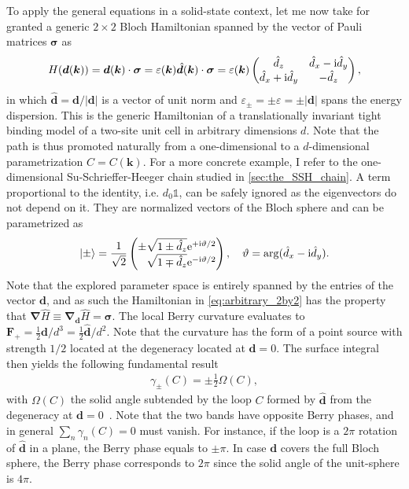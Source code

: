 To apply the general equations in a solid-state context, let me now take for granted a generic $2\times 2$ Bloch Hamiltonian spanned by the vector of Pauli matrices $\bm\sigma$ as
\begin{align}
    H(\bm d(\bm k)) = \bm d(\bm k)\cdot\bm\sigma = \varepsilon(\bm k) \hat{\bm d}(\bm k)\cdot\bm\sigma
    =
    \varepsilon(\bm k)
    \begin{pmatrix}
        \hat{d}_z & \hat{d}_x - \mathrm i \hat{d}_y \\
        \hat{d}_x + \mathrm i \hat{d}_y & -\hat{d}_z
    \end{pmatrix},
    \label{eq:arbitrary_2by2}
\end{align}
in which $\hat{\bm d}={\bm d}/|\bm d|$ is a vector of unit norm and $\varepsilon_\pm = \pm\varepsilon = \pm|\bm d|$ spans the energy dispersion.
This is the generic Hamiltonian of a translationally invariant tight binding model of a two-site unit cell in arbitrary dimensions $d$.
Note that the path is thus promoted naturally from a one-dimensional to a $d$-dimensional parametrization $C=C(\bm k)$.
For a more concrete example, I refer to the one-dimensional Su-Schrieffer-Heeger chain studied in \cref{sec:the_SSH_chain}.
A term proportional to the identity, i.e. $d_0\mathbb 1$, can be safely ignored as the eigenvectors do not depend on it.
They are normalized vectors of the Bloch sphere and can be parametrized as
\begin{align}
    \ket{\pm} = \frac{1}{\sqrt{2}}
    \begin{pmatrix}
        \pm \sqrt{1 \pm \hat{d}_z}\re^{+\ri\vartheta/2}\\
        \phantom\pm\sqrt{1 \mp \hat{d}_z}\re^{-\ri\vartheta/2}
    \end{pmatrix}
    ,
    \quad
    \vartheta = \arg(\hat{d}_x-\ri \hat{d}_y).
\end{align}
Note that the explored parameter space is entirely spanned by the entries of the vector $\bm d$, and as such the Hamiltonian in \cref{eq:arbitrary_2by2} has the property that $\bm\nabla\hat H \equiv \bm\nabla_{\bm d}\hat H = \bm\sigma$.
The local Berry curvature evaluates to ${\bm F}_+ = \frac12\bm d/d^3=\frac12\hat{\bm d}/d^2$.
Note that the curvature has the form of a point source with strength $1/2$ located at the degeneracy located at $\bm d=0$.
The surface integral then yields the following fundamental result
\begin{align}
    \gamma_{\pm}(C) = \pm\frac12\Omega(C),
\end{align}
with $\Omega(C)$ the solid angle subtended by the loop $C$ formed by $\hat {\bm d}$ from the degeneracy at $\bm d=0$~\cite{Berry1984}.
Note that the two bands have opposite Berry phases, and in general $\sum_n\gamma_n(C)=0$ must vanish.
For instance, if the loop is a $2\pi$ rotation of $\hat{\bm d}$ in a plane, the Berry phase equals to $\pm\pi$.
In case $\bm d$ covers the full Bloch sphere, the Berry phase corresponds to $2\pi$ since the solid angle of the unit-sphere is $4\pi$.

